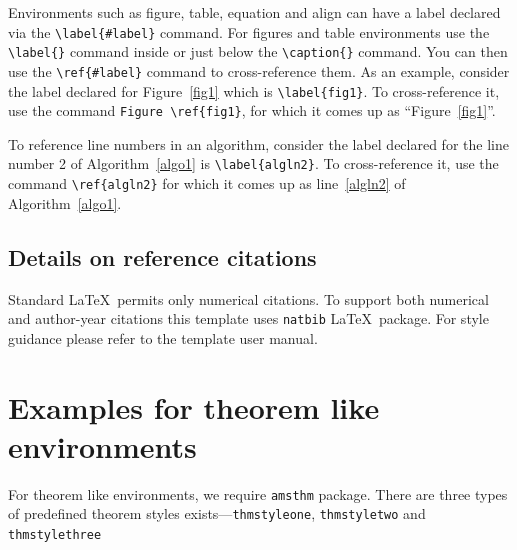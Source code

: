 \documentclass[pdflatex,sn-mathphys-num]{sn-jnl}%
\theoremstyle{thmstyleone}%
\theoremstyle{thmstyletwo}%
\theoremstyle{thmstylethree}%
\begin{document}
Environments such as figure, table, equation and align can have a label
declared via the \verb+\label{#label}+ command. For figures and table
environments use the \verb+\label{}+ command inside or just
below the \verb+\caption{}+ command. You can then use the
\verb+\ref{#label}+ command to cross-reference them. As an example, consider
the label declared for Figure~\ref{fig1} which is
\verb+\label{fig1}+. To cross-reference it, use the command 
\verb+Figure \ref{fig1}+, for which it comes up as
``Figure~\ref{fig1}''. 

To reference line numbers in an algorithm, consider the label declared for the line number 2 of Algorithm~\ref{algo1} is \verb+\label{algln2}+. To cross-reference it, use the command \verb+\ref{algln2}+ for which it comes up as line~\ref{algln2} of Algorithm~\ref{algo1}.

\subsection{Details on reference citations}\label{subsec7}

Standard \LaTeX\ permits only numerical citations. To support both numerical and author-year citations this template uses \verb+natbib+ \LaTeX\ package. For style guidance please refer to the template user manual.



\section{Examples for theorem like environments}\label{sec10}

For theorem like environments, we require \verb+amsthm+ package. There are three types of predefined theorem styles exists---\verb+thmstyleone+, \verb+thmstyletwo+ and \verb+thmstylethree+ 
\end{document}
